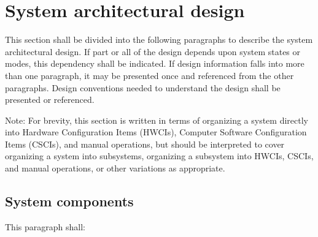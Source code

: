 \documentclass{fidata-report-template}
\begin{document}
\section{System architectural design}

This section shall be divided into the following paragraphs to describe
the system architectural design. If part or all of the design depends
upon system states or modes, this dependency shall be indicated. If
design information falls into more than one paragraph, it may be
presented once and referenced from the other paragraphs. Design
conventions needed to understand the design shall be presented or
referenced.

Note: For brevity, this section is written in terms of
organizing a system directly into Hardware Configuration Items (HWCIs),
Computer Software Configuration Items (CSCIs), and manual operations,
but should be interpreted to cover organizing a system into subsystems,
organizing a subsystem into HWCIs, CSCIs, and manual operations, or
other variations as appropriate.

\subsection{System components}

This paragraph shall:
\end{document}
